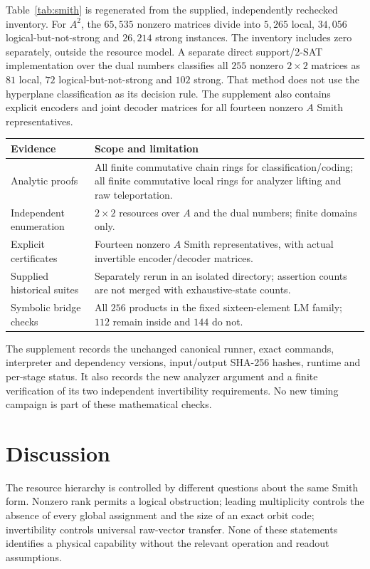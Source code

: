 \documentclass[11pt]{article}
\theoremstyle{definition}\newtheorem{definition}[theorem]{Definition}
\theoremstyle{remark}\newtheorem{remark}[theorem]{Remark}
\begin{document}


Table~\ref{tab:smith} is regenerated from the supplied, independently rechecked inventory. For $A^2$, the $65{,}535$ nonzero matrices divide into $5{,}265$ local, $34{,}056$ logical-but-not-strong and $26{,}214$ strong instances. The inventory includes zero separately, outside the resource model. A separate direct support/2-SAT implementation over the dual numbers classifies all $255$ nonzero $2\times2$ matrices as $81$ local, $72$ logical-but-not-strong and $102$ strong. That method does not use the hyperplane classification as its decision rule. The supplement also contains explicit encoders and joint decoder matrices for all fourteen nonzero $A$ Smith representatives.

\begin{center}\small
\begin{tabular}{p{.25\linewidth}p{.61\linewidth}}
\toprule
Evidence & Scope and limitation\\\midrule
Analytic proofs & All finite commutative chain rings for classification/coding; all finite commutative local rings for analyzer lifting and raw teleportation.\\
Independent enumeration & $2\times2$ resources over $A$ and the dual numbers; finite domains only.\\
Explicit certificates & Fourteen nonzero $A$ Smith representatives, with actual invertible encoder/decoder matrices.\\
Supplied historical suites & Separately rerun in an isolated directory; assertion counts are not merged with exhaustive-state counts.\\
Symbolic bridge checks & All $256$ products in the fixed sixteen-element LM family; $112$ remain inside and $144$ do not.\\\bottomrule
\end{tabular}
\end{center}

The supplement records the unchanged canonical runner, exact commands, interpreter and dependency versions, input/output SHA-256 hashes, runtime and per-stage status. It also records the new analyzer argument and a finite verification of its two independent invertibility requirements. No new timing campaign is part of these mathematical checks.

\section{Discussion}
The resource hierarchy is controlled by different questions about the same Smith form. Nonzero rank permits a logical obstruction; leading multiplicity controls the absence of every global assignment and the size of an exact orbit code; invertibility controls universal raw-vector transfer. None of these statements identifies a physical capability without the relevant operation and readout assumptions.
\end{document}
